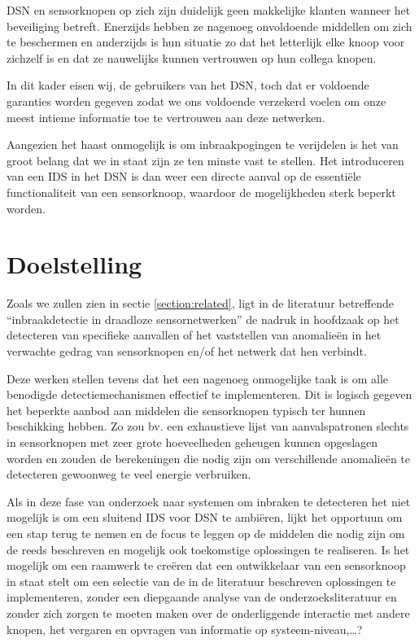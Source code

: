 DSN en sensorknopen op zich zijn duidelijk geen makkelijke klanten wanneer het
beveiliging betreft. Enerzijds hebben ze nagenoeg onvoldoende middellen om zich
te beschermen en anderzijds is hun situatie zo dat het letterlijk elke knoop
voor zichzelf is en dat ze nauwelijks kunnen vertrouwen op hun collega knopen.

In dit kader eisen wij, de gebruikers van het DSN, toch dat er voldoende
garanties worden gegeven zodat we ons voldoende verzekerd voelen om onze meest
intieme informatie toe te vertrouwen aan deze netwerken.

Aangezien het haast onmogelijk is om inbraakpogingen te verijdelen is het van
groot belang dat we in staat zijn ze ten minste vast te stellen. Het
introduceren van een IDS in het DSN is dan weer een directe aanval op de
essenti\"ele functionaliteit van een sensorknoop, waardoor de mogelijkheden
sterk beperkt worden.

\section{Doelstelling}
\label{section:doelstelling}

Zoals we zullen zien in sectie \ref{section:related}, ligt in de literatuur
betreffende ``inbraakdetectie in draadloze sensornetwerken'' de nadruk in
hoofdzaak op het detecteren van specifieke aanvallen of het vaststellen van
anomalie\"en in het verwachte gedrag van sensorknopen en/of het netwerk dat hen
verbindt.

Deze werken stellen tevens dat het een nagenoeg onmogelijke taak is om alle
benodigde detectiemechanismen effectief te implementeren. Dit is logisch
gegeven het beperkte aanbod aan middelen die sensorknopen typisch ter hunnen
beschikking hebben. Zo zou bv. een exhaustieve lijst van aanvalspatronen
slechts in sensorknopen met zeer grote hoeveelheden geheugen kunnen opgeslagen
worden en zouden de berekeningen die nodig zijn om verschillende anomalie\"en
te detecteren gewoonweg te veel energie verbruiken.

Als in deze fase van onderzoek naar systemen om inbraken te detecteren het niet
mogelijk is om een sluitend IDS voor DSN te ambi\"eren, lijkt het opportuun om
een stap terug te nemen en de focus te leggen op de middelen die nodig zijn om
de reeds beschreven en mogelijk ook toekomstige oplossingen te realiseren. Is
het mogelijk om een raamwerk te cre\"eren dat een ontwikkelaar van een
sensorknoop in staat stelt om een selectie van de in de literatuur beschreven
oplossingen te implementeren, zonder een diepgaande analyse van de
onderzoeksliteratuur en zonder zich zorgen te moeten maken over de
onderliggende interactie met andere knopen, het vergaren en opvragen van
informatie op systeem-niveau,\dots?

